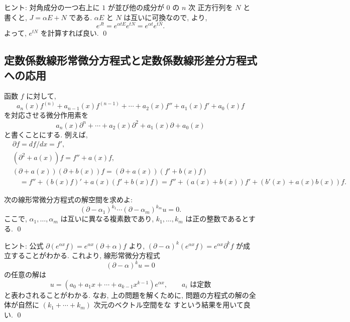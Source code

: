 \documentclass[12pt,twoside]{jarticle}
\begin{document}
\noindent
ヒント: 対角成分の一つ右上に $1$ が並び他の成分が $0$ の $n$ 次
正方行列を $N$ と書くと, $J = \alpha E + N$ である. 
$\alpha E$ と $N$ は互いに可換なので,  より,
\begin{equation*}
  e^{Jt} = e^{\alpha t E} e^{tN} = e^{\alpha t} e^{tN}.
\end{equation*}
よって, $e^{tN}$ を計算すれば良い.
\qed


\subsection{定数係数線形常微分方程式と定数係数線形差分方程式への応用}
\label{sec:sec-exp-app}


\bigskip

函数 $f$ に対して, 
\begin{equation*}
  a_n(x)f^{(n)}+a_{n-1}(x)f^{(n-1)}+\cdots+a_2(x)f''+a_1(x)f'+a_0(x)f
\end{equation*}
を対応させる微分作用素を
\begin{equation*}
  a_n(x)\partial^n+\cdots+a_2(x)\partial^2+a_1(x)\partial+a_0(x)
\end{equation*}
と書くことにする. 例えば, 
\begin{align*}
  & \partial f = df/dx = f', \\
  & (\partial^2 + a(x)) f = f'' + a(x)f, \\
  & (\partial + a(x))(\partial + b(x))f = (\partial + a(x))(f'+b(x)f) \\
  & \quad
    = f'' +(b(x)f)' + a(x)(f'+b(x)f) 
    = f'' + (a(x)+b(x))f' + (b'(x) + a(x)b(x)) f.
\end{align*}

\begin{question}[25点]
  次の線形常微分方程式の解空間を求めよ:
  \begin{equation*}
    (\partial - \alpha_1)^{k_1} \cdots (\partial - \alpha_m)^{k_m} u = 0.
  \end{equation*}
  ここで, $\alpha_1,\ldots,\alpha_m$ は互いに異なる複素数であり, 
  $k_1,\ldots,k_m$ は正の整数であるとする.
  \qed
\end{question}

\noindent ヒント: 公式 %
\( %
  \partial (e^{\alpha x} f) = e^{\alpha x} (\partial + \alpha) f
\) %
より,
\( %
  (\partial - \alpha)^k(e^{\alpha x} f)
  = e^{\alpha x} \partial^k f
\) %
が成立することがわかる. これより, 線形常微分方程式
\begin{equation*}
  (\partial - \alpha)^k u = 0
  \tag{$*$}
\end{equation*}
の任意の解は
\begin{equation*}
  u = (a_0 + a_1 x + \cdots + a_{k-1} x^{k-1}) e^{\alpha x},
  \qquad
  \text{$a_i$ は定数}
\end{equation*}
と表わされることがわかる. なお, 上の問題を解くために, 
問題の方程式の解の全体が自然に $(k_1 + \cdots + k_m)$ 次元のベクトル空間をな
すという結果を用いて良い. 
\qed
\end{document}
